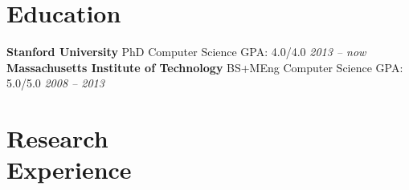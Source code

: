 \documentclass[margin,line]{resume}
\begin{document}
\begin{resume}

\section{\mysidestyle Education}

\textbf{Stanford University} \hspace{30.0mm} PhD \hspace{11.2mm} Computer Science \hspace{2.5mm} GPA: 4.0/4.0 \hfill \textsl{2013 -- now}\\
\textbf{Massachusetts Institute of Technology} \hspace{2.5mm} BS+MEng \hspace{2.5mm} Computer Science \hspace{2.5mm} GPA: 5.0/5.0 \hfill \textsl{2008 -- 2013}



\vspace{-2mm}

\section{\mysidestyle Research\\Experience}


\end{resume}
\end{document}
